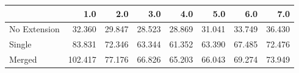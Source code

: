 \begin{tabular}{lrrrrrrr}
\toprule
{} &     1.0 &    2.0 &    3.0 &    4.0 &    5.0 &    6.0 &    7.0 \\
\midrule
No Extension &  32.360 & 29.847 & 28.523 & 28.869 & 31.041 & 33.749 & 36.430 \\
Single       &  83.831 & 72.346 & 63.344 & 61.352 & 63.390 & 67.485 & 72.476 \\
Merged       & 102.417 & 77.176 & 66.826 & 65.203 & 66.043 & 69.274 & 73.949 \\
\bottomrule
\end{tabular}
